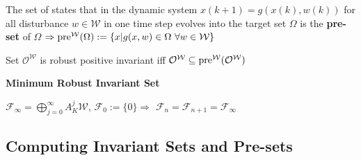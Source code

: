 \begin{definition}
	The set of states that
	in the dynamic system $x(k+1) = g(x(k),w(k))$
	for all disturbance $w\in\mathcal{W}$
	in one time step evolves into the target set $\Omega$
	is the \textbf{pre-set} of $\Omega$
	$\Rightarrow \operatorname{pre}^\mathcal{W}(\Omega) :=
		\{x|g(x,w)\in \Omega\ \forall w\in\mathcal{W}\}$
\end{definition}

\begin{theorem}
	Set $\mathcal{O}^\mathcal{W}$
	is robust positive invariant iff
	$\mathcal{O}^\mathcal{W} \subseteq
		\operatorname{pre}^\mathcal{W}(\mathcal{O}^\mathcal{W})$
\end{theorem}

\textbf{Minimum Robust Invariant Set}

$\mathcal{F}_\infty = \bigoplus_{j=0}^\infty A_K^j \mathcal{W}$,
$\mathcal{F}_0 := \{0\}\Rightarrow$
$\mathcal{F}_n = \mathcal{F}_{n+1} = \mathcal{F}_\infty$

\subsection{Computing Invariant Sets and Pre-sets}

